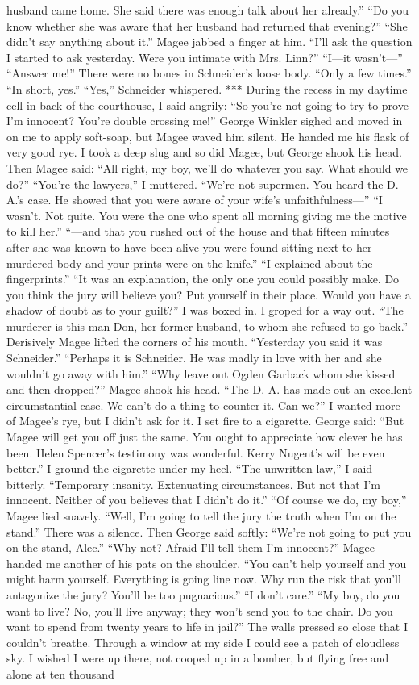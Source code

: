 \documentclass{novel}
\begin{document}
husband came home. She said there was enough talk about her already.” “Do you know whether she was aware that her husband had returned that evening?” “She didn’t say anything about it.” Magee jabbed a finger at him. “I’ll ask the question I started to ask yesterday. Were you intimate with Mrs. Linn?” “I—it wasn’t—” “Answer me!” There were no bones in Schneider’s loose body. “Only a few times.” “In short, yes.” “Yes,” Schneider whispered. *** During the recess in my daytime cell in back of the courthouse, I said angrily: “So you’re not going to try to prove I’m innocent? You’re double crossing me!” George Winkler sighed and moved in on me to apply soft-soap, but Magee waved him silent. He handed me his flask of very good rye. I took a deep slug and so did Magee, but George shook his head. Then Magee said: “All right, my boy, we’ll do whatever you say. What should we do?” “You’re the lawyers,” I muttered. “We’re not supermen. You heard the D. A.’s case. He showed that you were aware of your wife’s unfaithfulness—” “I wasn’t. Not quite. You were the one who spent all morning giving me the motive to kill her.” “—and that you rushed out of the house and that fifteen minutes after she was known to have been alive you were found sitting next to her murdered body and your prints were on the knife.” “I explained about the fingerprints.” “It was an explanation, the only one you could possibly make. Do you think the jury will believe you? Put yourself in their place. Would you have a shadow of doubt as to your guilt?” I was boxed in. I groped for a way out. “The murderer is this man Don, her former husband, to whom she refused to go back.” Derisively Magee lifted the corners of his mouth. “Yesterday you said it was Schneider.” “Perhaps it is Schneider. He was madly in love with her and she wouldn’t go away with him.” “Why leave out Ogden Garback whom she kissed and then dropped?” Magee shook his head. “The D. A. has made out an excellent circumstantial case. We can’t do a thing to counter it. Can we?” I wanted more of Magee’s rye, but I didn’t ask for it. I set fire to a cigarette. George said: “But Magee will get you off just the same. You ought to appreciate how clever he has been. Helen Spencer’s testimony was wonderful. Kerry Nugent’s will be even better.” I ground the cigarette under my heel. “The unwritten law,” I said bitterly. “Temporary insanity. Extenuating circumstances. But not that I’m innocent. Neither of you believes that I didn’t do it.” “Of course we do, my boy,” Magee lied suavely. “Well, I’m going to tell the jury the truth when I’m on the stand.” There was a silence. Then George said softly: “We’re not going to put you on the stand, Alec.” “Why not? Afraid I’ll tell them I’m innocent?” Magee handed me another of his pats on the shoulder. “You can’t help yourself and you might harm yourself. Everything is going line now. Why run the risk that you’ll antagonize the jury? You’ll be too pugnacious.” “I don’t care.” “My boy, do you want to live? No, you’ll live anyway; they won’t send you to the chair. Do you want to spend from twenty years to life in jail?” The walls pressed so close that I couldn’t breathe. Through a window at my side I could see a patch of cloudless sky. I wished I were up there, not cooped up in a bomber, but flying free and alone at ten thousand 
\end{document}

